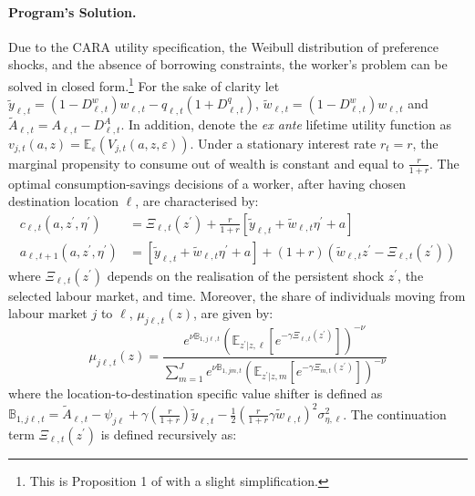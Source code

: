 \documentclass[11pt, a4paper]{article}
\begin{document}
\paragraph{Program's Solution.} Due to the CARA utility specification, the Weibull distribution of preference shocks, and the absence of borrowing constraints, the worker's problem can be solved in closed form.\footnote{This is Proposition 1 of \citet{dvorkin_geography_2025} with a slight simplification.} For the sake of clarity let $\tilde{y}_{\ell,t} = (1 - D^w_{\ell,t})w_{\ell,t} - q_{\ell,t}(1+ D^q_{\ell,t})$,  $\tilde{w}_{\ell,t} = (1 - D^w_{\ell,t})w_{\ell,t}$ and $\tilde{A}_{\ell,t} = A_{\ell,t} - D^A_{\ell,t}$. In addition, denote the \textit{ex ante} lifetime utility function as $v_{j,t}(a, z) = \mathbb{E}_\varepsilon\left(V_{j,t}(a, z, \varepsilon)\right)$. Under a stationary interest rate $r_t = r$, the marginal propensity to consume out of wealth is constant and equal to $\frac{r}{1+r}$. The optimal consumption-savings decisions of a worker, after having chosen destination location $\ell$, are characterised by:
\begin{align}
c_{\ell,t}(a, z^\prime, \eta^\prime) &= \Xi_{\ell,t}(z^\prime) + \frac{r}{1+r} \left[ \tilde{y}_{\ell,t} + \tilde{w}_{\ell,t}\eta^\prime + a \right] \label{eq:cpol} \\
a_{\ell,t+1}(a, z^\prime, \eta^\prime) &= \left[ \tilde{y}_{\ell,t} + \tilde{w}_{\ell,t}\eta^\prime + a \right] + (1+r) \left( \tilde{w}_{\ell,t}z^\prime - \Xi_{\ell,t}(z^\prime) \right) \label{eq:apol}
\end{align}
where $\Xi_{\ell,t}(z^\prime)$ depends on the realisation of the persistent shock $z^\prime$, the selected labour market, and time. Moreover, the share of individuals moving from labour market $j$ to $\ell$, $\mu_{j\ell,t}(z)$, are given by:
\begin{equation}
\mu_{j\ell,t}(z) = \frac{ e^{\nu \mathbb{B}_{1,j\ell,t}} \left( \mathbb{E}_{z^\prime | z, \ell} \left[ e^{-\gamma \Xi_{\ell,t}(z^\prime)} \right] \right)^{-\nu} }{ \sum_{m=1}^J e^{\nu \mathbb{B}_{1,jm,t}} \left( \mathbb{E}_{z^\prime | z, m} \left[ e^{-\gamma \Xi_{m,t}(z^\prime)} \right] \right)^{-\nu} }
\label{eq:mu}
\end{equation}
where the location-to-destination specific value shifter is defined as $\mathbb{B}_{1,j\ell,t} = \tilde{A}_{\ell,t} - \psi_{j\ell} + \gamma \left(\frac{r}{1+r}\right) \tilde{y}_{\ell,t} - \frac{1}{2}\left(\frac{r}{1+r} \gamma \tilde{w}_{\ell,t}\right)^2 \sigma_{\eta,\ell}^2$. The continuation term $\Xi_{\ell,t}(z^\prime)$ is defined recursively as:
\end{document}
